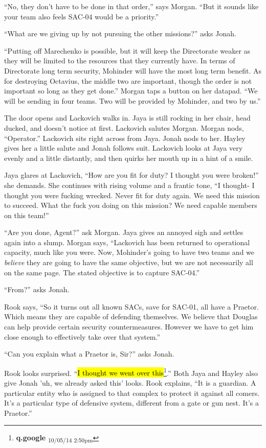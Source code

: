 ``No, they don't have to be done in that order,'' says Morgan.  ``But it sounds like your team also feels SAC-04 would be a priority.''

``What are we giving up by not pursuing the other missions?'' asks Jonah.

``Putting off Marechenko is possible, but it will keep the Directorate weaker as they will be limited to the resources that they currently have.  In terms of Directorate long term security, Mohinder will have the most long term benefit.  As for destroying Octavius, the middle two are important, though the order is not important so long as they get done.''  Morgan taps a button on her datapad.  ``We will be sending in four teams.  Two will be provided by Mohinder, and two by us.''

The door opens and Lackovich walks in.  Jaya is still rocking in her chair, head ducked, and doesn't notice at first.  Lackovich salutes Morgan.  Morgan nods, ``Operator.''   Lackovich sits right across from Jaya.  Jonah nods to her.  Hayley gives her a little salute and Jonah follows suit.  Lackovich looks at Jaya very evenly and a little distantly, and then quirks her mouth up in a hint of a smile.

Jaya glares at Lackovich, ``How are you fit for duty?  I thought you were broken!'' she demands.  She continues with rising volume and a frantic tone, ``I thought- I thought you were fucking wrecked.  Never fit for duty again.  We need this mission to succeed.  What the fuck you doing on this mission?  We need capable members on this team!''

``Are you done, Agent?'' ask Morgan.  Jaya gives an annoyed sigh and settles again into a slump.  Morgan says, ``Lackovich has been returned to operational capacity, much like you were.  Now, Mohinder's going to have two teams and we \textit{believe }they are going to have the same objective, but we are not necessarily all on the same page.  The stated objective is to capture SAC-04.''

``From?'' asks Jonah.

Rook says, ``So it turns out all known SACs, save for SAC-01, all have a Praetor.  Which means they are capable of defending themselves.  We believe that Douglas can help provide certain security countermeasures.  However we have to get him close enough to effectively take over that system.''

``Can you explain what a Praetor is, Sir?'' asks Jonah.

Rook looks surprised.  ``\hl{I thought we went over this}\footnote{\textbf{q.google } \textsubscript{10/05/14 2:50pm}}.''  Both Jaya and Hayley also give Jonah 'uh, we already asked this' looks.  Rook explains, ``It is a guardian.  A particular entity who is assigned to that complex to protect it against all comers.  It's a particular type of defensive system, different from a gate or gun nest.  It's a Praetor.''


